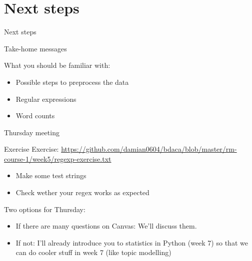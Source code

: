 \documentclass{beamer}
\begin{document}
\section{Next steps}

\begin{frame}[plain]
\huge Next steps
  \end{frame}


\begin{frame}{Take-home messages}
\begin{block}{What you should be familiar with:}
\begin{itemize}
\item Possible steps to preprocess the data
\item Regular expressions
\item Word counts
\end{itemize}
\end{block}
\end{frame}





\begin{frame}{Thursday meeting}

  \begin{block}{Exercise}
    Exercise: 
    \url{https://github.com/damian0604/bdaca/blob/master/rm-course-1/week5/regexp-exercise.txt}

    \begin{itemize}
    \item Make some test strings
    \item Check wether your regex works as expected
    \end{itemize}


  \end{block}
  
\begin{block}{Two options for Thursday:}
\begin{itemize}
\item If there are many questions on Canvas: We'll discuss them.
\item If not: I'll already introduce you to statistics in Python (week 7) so that we can do cooler stuff in week 7 (like topic modelling)
\end{itemize}
\end{block}
\end{frame}
\end{document}
